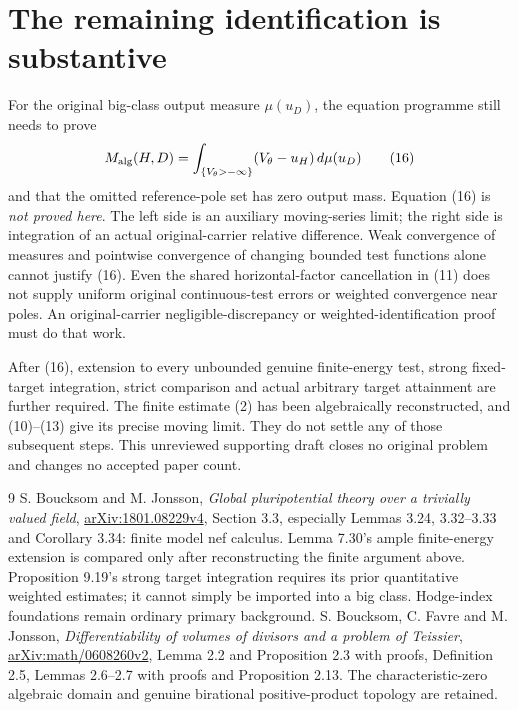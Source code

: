 \documentclass[10pt]{article}
\begin{document}
\section{The remaining identification is substantive}
For the original big-class output measure $\mu(u_D)$, the equation
programme still needs to prove
\[
 M_{\rm alg}(H,D)
       =\int_{\{V_\theta> -\infty\}}(V_\theta-u_H)\,d\mu(u_D)
 \tag{16}
\]
and that the omitted reference-pole set has zero output mass.
Equation (16) is \emph{not proved here}. The left side is an auxiliary
moving-series limit; the right side is integration of an actual
original-carrier relative difference. Weak convergence of measures and
pointwise convergence of changing bounded test functions alone cannot
justify (16). Even the shared horizontal-factor cancellation in (11)
does not supply uniform original continuous-test errors or weighted
convergence near poles. An original-carrier negligible-discrepancy or
weighted-identification proof must do that work.

After (16), extension to every unbounded genuine finite-energy test,
strong fixed-target integration, strict comparison and actual arbitrary
target attainment are further required. The finite estimate (2) has
been algebraically reconstructed, and (10)--(13) give its precise moving
limit. They do not settle any of those subsequent steps. This unreviewed
supporting draft closes no original problem and changes no accepted
paper count.

\begin{thebibliography}{9}
 S. Boucksom and M. Jonsson,
\emph{Global pluripotential theory over a trivially valued field},
\href{https://arxiv.org/pdf/1801.08229v4}{arXiv:1801.08229v4},
Section 3.3, especially Lemmas 3.24, 3.32--3.33 and Corollary 3.34:
finite model nef calculus. Lemma 7.30's ample finite-energy extension
is compared only after reconstructing the finite argument above.
Proposition 9.19's strong target integration requires its prior
quantitative weighted estimates; it cannot simply be imported into a
big class. Hodge-index foundations remain ordinary primary background.
 S. Boucksom, C. Favre and M. Jonsson,
\emph{Differentiability of volumes of divisors and a problem of Teissier},
\href{https://arxiv.org/html/math/0608260v2}{arXiv:math/0608260v2},
Lemma 2.2 and Proposition 2.3 with proofs, Definition 2.5,
Lemmas 2.6--2.7 with proofs and Proposition 2.13.
The characteristic-zero algebraic domain and genuine birational
positive-product topology are retained.
\end{thebibliography}
\end{document}
